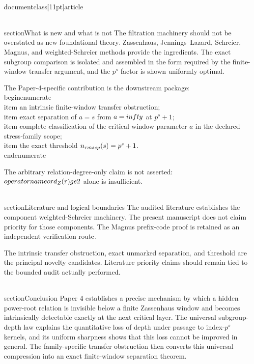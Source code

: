 \\documentclass[11pt]{article}
\begin{document}
\\section{What is new and what is not}
The filtration machinery should not be overstated as new foundational theory. Zassenhaus, Jennings--Lazard, Schreier, Magnus, and weighted-Schreier methods provide the ingredients. The exact subgroup comparison is isolated and assembled in the form required by the finite-window transfer argument, and the $p^s$ factor is shown uniformly optimal.

The Paper-4-specific contribution is the downstream package:
\\begin{enumerate}
\\item an intrinsic finite-window transfer obstruction;
\\item exact separation of $a=s$ from $a=\\infty$ at $p^s+1$;
\\item complete classification of the critical-window parameter $a$ in the declared stress-family scope;
\\item the exact threshold $n_{\\rm sep}(s)=p^s+1$.
\\end{enumerate}

The arbitrary relation-degree-only claim is not asserted: $\\operatorname{ord}_Z(r)\\ge2$ alone is insufficient.

\\section{Literature and logical boundaries}
The audited literature establishes the component weighted-Schreier machinery. The present manuscript does not claim priority for those components. The Magnus prefix-code proof is retained as an independent verification route.

The intrinsic transfer obstruction, exact unmarked separation, and threshold are the principal novelty candidates. Literature priority claims should remain tied to the bounded audit actually performed.

\\section{Conclusion}
Paper 4 establishes a precise mechanism by which a hidden power-root relation is invisible below a finite Zassenhaus window and becomes intrinsically detectable exactly at the next critical layer. The universal subgroup-depth law explains the quantitative loss of depth under passage to index-$p^s$ kernels, and its uniform sharpness shows that this loss cannot be improved in general. The family-specific transfer obstruction then converts this universal compression into an exact finite-window separation theorem.

\
\end{document}
